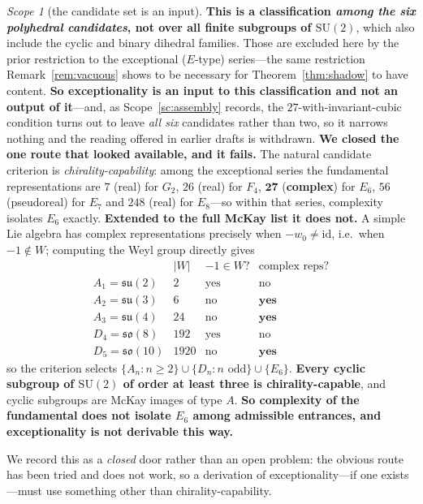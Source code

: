 \documentclass[11pt,reqno]{amsart}
\theoremstyle{plain}
\theoremstyle{definition}
\theoremstyle{remark}
\newtheorem{scope}[theorem]{Scope}
\newcommand{\SU}{\mathrm{SU}}
\newcommand{\su}{\mathfrak{su}}
\newcommand{\so}{\mathfrak{so}}
\begin{document}
\begin{scope}[the candidate set is an input]\label{sc:candidates}
\textbf{This is a classification \emph{among the six polyhedral candidates}, not over
all finite subgroups of $\SU(2)$}, which also include the cyclic and binary dihedral
families. Those are excluded here by the prior restriction to the exceptional
($E$-type) series---the same restriction Remark~\ref{rem:vacuous} shows to be necessary
for Theorem~\ref{thm:shadow} to have content. \textbf{So exceptionality is an input to
this classification and not an output of it}---and, as Scope~\ref{sc:assembly} records, the
$27$-with-invariant-cubic condition turns out to leave \emph{all six} candidates rather than
two, so it narrows nothing and the reading offered in earlier drafts is withdrawn.
\textbf{We closed the one route that looked available, and it fails.} The natural
candidate criterion is \emph{chirality-capability}: among the exceptional series the
fundamental representations are $7$ (real) for $G_2$, $26$ (real) for $F_4$, $\mathbf{27}$
(\textbf{complex}) for $E_6$, $56$ (pseudoreal) for $E_7$ and $248$ (real) for $E_8$---so
within that series, complexity isolates $E_6$ exactly. \textbf{Extended to the full McKay
list it does not.} A simple Lie algebra has complex representations precisely when
$-w_0\neq\mathrm{id}$, i.e.\ when $-1\notin W$; computing the Weyl group directly gives
\[
  \begin{array}{lccc}
   & |W| & -1\in W? & \text{complex reps?}\\
  A_1=\su(2) & 2 & \text{yes} & \text{no}\\
  A_2=\su(3) & 6 & \text{no} & \textbf{yes}\\
  A_3=\su(4) & 24 & \text{no} & \textbf{yes}\\
  D_4=\so(8) & 192 & \text{yes} & \text{no}\\
  D_5=\so(10) & 1920 & \text{no} & \textbf{yes}
  \end{array}
\]
so the criterion selects $\{A_n:n\ge2\}\cup\{D_n:n\text{ odd}\}\cup\{E_6\}$. \textbf{Every
cyclic subgroup of $\SU(2)$ of order at least three is chirality-capable}, and cyclic
subgroups are McKay images of type $A$. \textbf{So complexity of the fundamental does not
isolate $E_6$ among admissible entrances, and exceptionality is not derivable this way.}

We record this as a \emph{closed} door rather than an open problem: the obvious route has
been tried and does not work, so a derivation of exceptionality---if one exists---must use
something other than chirality-capability.
\end{scope}
\end{document}
